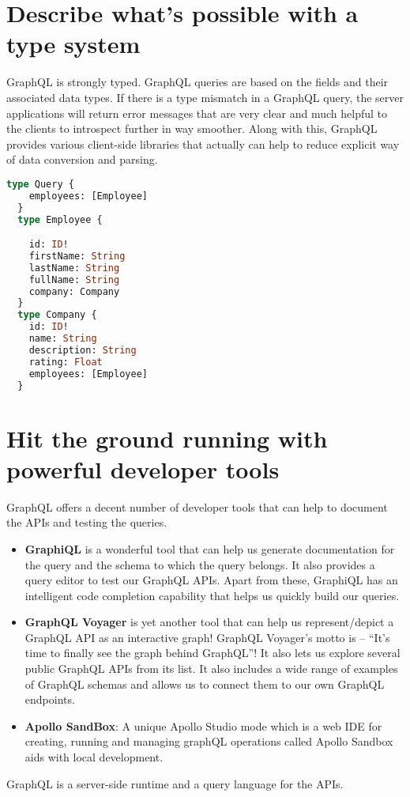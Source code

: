 \documentclass[../main.tex]{subfiles}
\begin{document}
\section{Describe what’s possible with a type system}
GraphQL is strongly typed. 
GraphQL queries are based on the fields and their associated data types.
If there is a type mismatch in a GraphQL query, the server applications will return error messages that are very clear and much helpful to the clients to introspect further in way smoother.
Along with this, GraphQL provides various client-side libraries that actually can help to reduce explicit way of data conversion and parsing.

\begin{lstlisting}[language=GraphQL, label={lst:graphql-sample-typing}, caption={Example of GraphQL typing}]
  type Query {
    employees: [Employee]
  }
  type Employee {

    id: ID!
    firstName: String
    lastName: String
    fullName: String
    company: Company
  }
  type Company {
    id: ID!
    name: String
    description: String
    rating: Float
    employees: [Employee]
  }

\end{lstlisting}

\section{Hit the ground running with powerful developer tools}
GraphQL offers a decent number of developer tools that can help to document the APIs and testing the queries.

\begin{itemize}
  \item \textbf{GraphiQL} is a wonderful tool that can help us generate documentation for the query and the schema to which the query belongs. It also provides a query editor to test our GraphQL APIs. Apart from these, GraphiQL has an intelligent code completion capability that helps us quickly build our queries.
  \item \textbf{GraphQL Voyager} is yet another tool that can help us represent/depict a GraphQL API as an interactive graph! GraphQL Voyager's motto is – “It's time to finally see the graph behind GraphQL”!  It also lets us explore several public GraphQL APIs from its list. It also includes a wide range of examples of GraphQL schemas and allows us to connect them to our own GraphQL endpoints.
  \item \textbf{Apollo SandBox}:  A unique Apollo Studio mode which is a web IDE for creating, running and managing graphQL operations called Apollo Sandbox aids with local development.
\end{itemize}
GraphQL is a server-side runtime and a query language for the APIs. 
\end{document}
